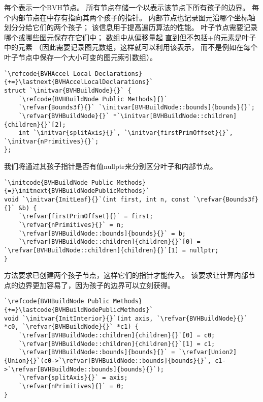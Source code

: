 每个表示一个BVH节点。
所有节点存储一个以表示该节点下所有孩子的边界。
每个内部节点在中存有指向其两个孩子的指针。
内部节点也记录图元沿哪个坐标轴划分分给它们的两个孩子；
该信息用于提高遍历算法的性能。
叶子节点需要记录哪个或哪些图元保存在它们中；
数组中从偏移量起
直到但不包括{\ttfamily{}+}的元素是叶子中的元素
（因此需要记录图元数组，这样就可以利用该表示，
而不是例如在每个叶子节点中保存一个大小可变的图元索引数组）。
\begin{lstlisting}
`\refcode{BVHAccel Local Declarations}{+=}\lastnext{BVHAccelLocalDeclarations}`
struct `\initvar{BVHBuildNode}{}` {
    `\refcode{BVHBuildNode Public Methods}{}`
    `\refvar{Bounds3f}{}` `\initvar[BVHBuildNode::bounds]{bounds}{}`;
    `\refvar{BVHBuildNode}{}` *`\initvar[BVHBuildNode::children]{children}{}`[2];
    int `\initvar{splitAxis}{}`, `\initvar{firstPrimOffset}{}`, `\initvar{nPrimitives}{}`;
};
\end{lstlisting}

我们将通过其孩子指针是否有值{\ttfamily nullptr}来分别区分叶子和内部节点。
\begin{lstlisting}
`\initcode{BVHBuildNode Public Methods}{=}\initnext{BVHBuildNodePublicMethods}`
void `\initvar{InitLeaf}{}`(int first, int n, const `\refvar{Bounds3f}{}` &b) {
    `\refvar{firstPrimOffset}{}` = first;
    `\refvar{nPrimitives}{}` = n;
    `\refvar[BVHBuildNode::bounds]{bounds}{}` = b;
    `\refvar[BVHBuildNode::children]{children}{}`[0] = `\refvar[BVHBuildNode::children]{children}{}`[1] = nullptr;
}
\end{lstlisting}

方法要求已创建两个孩子节点，这样它们的指针才能传入。
该要求让计算内部节点的边界更加容易了，因为孩子的边界可以立刻获得。
\begin{lstlisting}
`\refcode{BVHBuildNode Public Methods}{+=}\lastcode{BVHBuildNodePublicMethods}`
void `\initvar{InitInterior}{}`(int axis, `\refvar{BVHBuildNode}{}` *c0, `\refvar{BVHBuildNode}{}` *c1) {
    `\refvar[BVHBuildNode::children]{children}{}`[0] = c0;
    `\refvar[BVHBuildNode::children]{children}{}`[1] = c1;
    `\refvar[BVHBuildNode::bounds]{bounds}{}` = `\refvar[Union2]{Union}{}`(c0->`\refvar[BVHBuildNode::bounds]{bounds}{}`, c1->`\refvar[BVHBuildNode::bounds]{bounds}{}`);
    `\refvar{splitAxis}{}` = axis;
    `\refvar{nPrimitives}{}` = 0;
}
\end{lstlisting}

